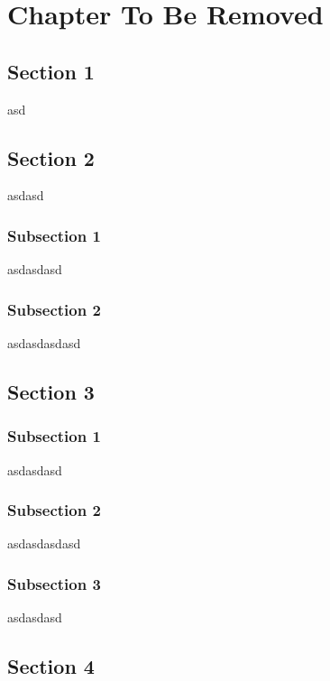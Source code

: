 \label{ChapterX}
\chapter{Chapter To Be Removed}

\section{Section 1}
asd

\section{Section 2}
asdasd

\subsection{Subsection 1}
asdasdasd

\subsection{Subsection 2}
asdasdasdasd

\section{Section 3}

\subsection{Subsection 1}
asdasdasd

\subsection{Subsection 2}
asdasdasdasd

\subsection{Subsection 3}
asdasdasd

\section{Section 4}
